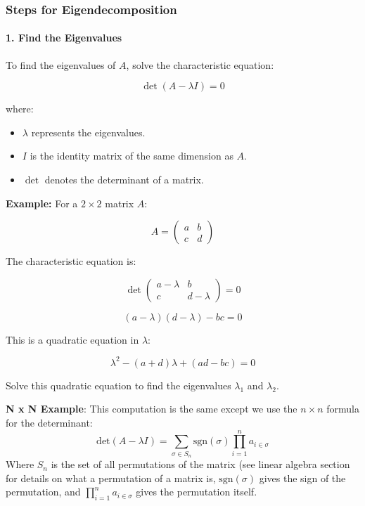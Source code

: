 \documentclass[12pt]{article}
\begin{document}
\subsubsection{Steps for Eigendecomposition}

\paragraph{1. Find the Eigenvalues}
To find the eigenvalues of \( A \), solve the characteristic equation:

\[ \det(A - \lambda I) = 0 \]

where:
\begin{itemize}
    \item \( \lambda \) represents the eigenvalues.
    \item \( I \) is the identity matrix of the same dimension as \( A \).
    \item \(\det\) denotes the determinant of a matrix.
\end{itemize}

\textbf{Example:} For a \( 2 \times 2 \) matrix \( A \):

\[ A = \begin{pmatrix} a & b \\ c & d \end{pmatrix} \]

The characteristic equation is:

\[ \det \begin{pmatrix} a - \lambda & b \\ c & d - \lambda \end{pmatrix} = 0 \]

\[ (a - \lambda)(d - \lambda) - bc = 0 \]

This is a quadratic equation in \( \lambda \):

\[ \lambda^2 - (a + d)\lambda + (ad - bc) = 0 \]

Solve this quadratic equation to find the eigenvalues \( \lambda_1 \) and \( \lambda_2 \).

\textbf{N x N Example}:
This computation is the same except we use the \(n \times n\) formula for the determinant:
\[\text{det}(A-\lambda I) = \sum_{\sigma \in S_n}\text{sgn}(\sigma)\prod_{i=1}^na_{i \in \sigma}\]
Where \(S_n\) is the set of all permutations of the matrix (see linear algebra section for details on what a permutation of a matrix is, \(\text{sgn}(\sigma)\) gives the sign of the permutation, and \(\prod_{i=1}^na_{i \in \sigma}\) gives the permutation itself.
\end{document}
